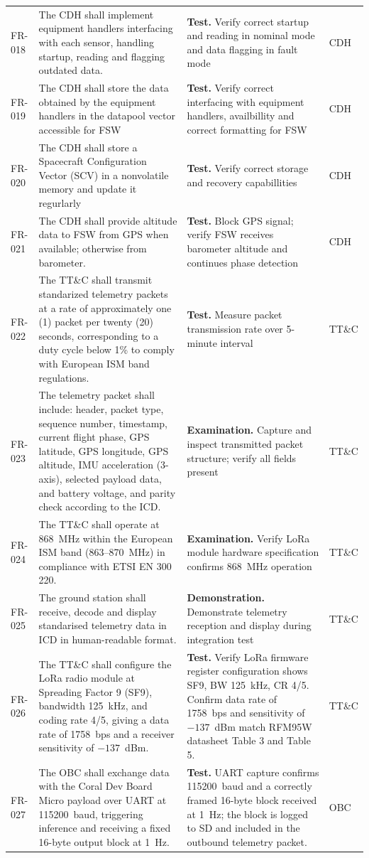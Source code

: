 \begin{landscape}
\begin{longtable}{p{1.4cm}p{8.2cm}p{10.2cm}p{1.9cm}}
FR-018 & The CDH shall implement equipment handlers interfacing with each sensor, handling startup, reading and flagging outdated data. & \textbf{Test.} Verify correct startup and reading in nominal mode and data flagging in fault mode & CDH \\
FR-019 & The CDH shall store the data obtained by the equipment handlers in the datapool vector accessible for FSW & \textbf{Test.} Verify correct interfacing with equipment handlers, availbillity and correct formatting for FSW & CDH \\
FR-020 & The CDH shall store a Spacecraft Configuration Vector (SCV) in a nonvolatile memory and update it regurlarly & \textbf{Test.} Verify correct storage and recovery capabillities & CDH \\
FR-021 & The CDH shall provide altitude data to FSW from GPS when available; otherwise from barometer. & \textbf{Test.} Block GPS signal; verify FSW receives barometer altitude and continues phase detection & CDH \\
FR-022 & The TT\&C shall transmit standarized telemetry packets at a rate of approximately one (1) packet per twenty (20) seconds, corresponding to a duty cycle below 1\% to comply with European ISM band regulations. & \textbf{Test.} Measure packet transmission rate over 5-minute interval & TT\&C \\
FR-023 & The telemetry packet shall include: header, packet type, sequence number, timestamp, current flight phase, GPS latitude, GPS longitude, GPS altitude, IMU acceleration (3-axis), selected payload data, and battery voltage, and parity check according to the ICD. & \textbf{Examination.} Capture and inspect transmitted packet structure; verify all fields present & TT\&C \\
FR-024 & The TT\&C shall operate at 868~MHz within the European ISM band (863--870~MHz) in compliance with ETSI EN 300 220. & \textbf{Examination.} Verify LoRa module hardware specification confirms 868~MHz operation & TT\&C \\
FR-025 & The ground station shall receive, decode and display standarised telemetry data in ICD in human-readable format. & \textbf{Demonstration.} Demonstrate telemetry reception and display during integration test & TT\&C \\
FR-026 & The TT\&C shall configure the LoRa radio module at Spreading Factor 9 (SF9), bandwidth 125~kHz, and coding rate 4/5, giving a data rate of 1758~bps and a receiver sensitivity of $-137$~dBm. & \textbf{Test.} Verify LoRa firmware register configuration shows SF9, BW 125~kHz, CR 4/5. Confirm data rate of 1758~bps and sensitivity of $-137$~dBm match RFM95W datasheet Table 3 and Table 5. & TT\&C \\
FR-027 & The OBC shall exchange data with the Coral Dev Board Micro payload over UART at 115200~baud, triggering inference and receiving a fixed 16-byte output block at 1~Hz. & \textbf{Test.} UART capture confirms 115200~baud and a correctly framed 16-byte block received at 1~Hz; the block is logged to SD and included in the outbound telemetry packet. & OBC \\
\end{longtable}


\end{landscape}
